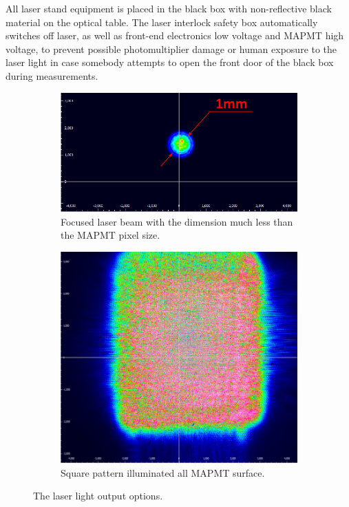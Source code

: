 All laser stand equipment is placed in the black box with non-reflective black material on the optical table. The laser interlock safety box automatically switches off laser, as well as front-end electronics low voltage and MAPMT high voltage, to prevent possible photomultiplier damage or human exposure to the laser light in case somebody attempts to open the front door of the black box during measurements.

\begin{figure}[bt]
	\centering
	\begin{subfigure}[b]{0.628\linewidth}
		\includegraphics[width=\linewidth]{figures/beamspot.pdf}
		\caption{Focused laser beam with the dimension much less than the  MAPMT pixel size.}
		\label{fig:beamopt1}
	\end{subfigure}
	\begin{subfigure}[b]{0.354\linewidth}
		\includegraphics[width=\linewidth]{figures/beamsquare.pdf}
		\caption{Square pattern illuminated all MAPMT surface.}
		\label{fig:beamopt2}
	\end{subfigure}
	\caption{The laser light output options.}
\end{figure}

